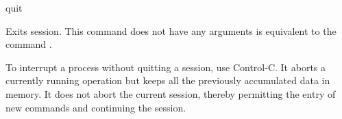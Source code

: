 \begin{command}{quit}{}
	
	\syntax{\obligatory{()}}
	
	\begin{poydescription}
        Exits \poy session. This command does not have any arguments
         is equivalent to the command .
        \end{poydescription}

 \begin{statement}
	To interrupt a process without quitting a \poy session, use Control-C.
	 It aborts a currently running operation but keeps all the previously accumulated
	 data in memory. It does not abort the current session, thereby permitting the 
	 entry of  new commands and continuing the session.
	\end{statement}

    \begin{poyexamples}
    \end{poyexamples}
    
    \begin{poyalso}
    \end{poyalso}
\end{command}

   

